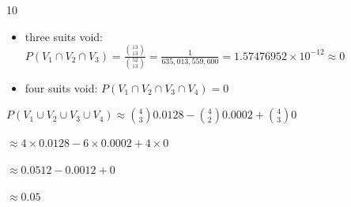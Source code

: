 \documentclass[12 pt]{article}
\begin{document}
\begin{exercise}{10}
\begin{itemize}
        \item three suits void: $P(V_1 \cap V_2 \cap V_3) = \frac{\binom{13}{13}}{\binom{52}{13}} = \frac{1}{635,013,559,600} = 1.57476952 \times 10^{-12} \approx 0$

        \item four suits void: $P(V_1 \cap V_2 \cap V_3 \cap V_4) = 0$
    \end{itemize}

    $P(V_1 \cup V_2 \cup V_3 \cup V_4) \approx \binom{4}{3} 0.0128 - \binom{4}{2} 0.0002 + \binom{4}{3} 0$

    $\approx 4 \times 0.0128 - 6 \times 0.0002 + 4 \times 0$

    $\approx 0.0512 - 0.0012 + 0$

    $\approx 0.05$
        
    \end{exercise}
\end{document}

